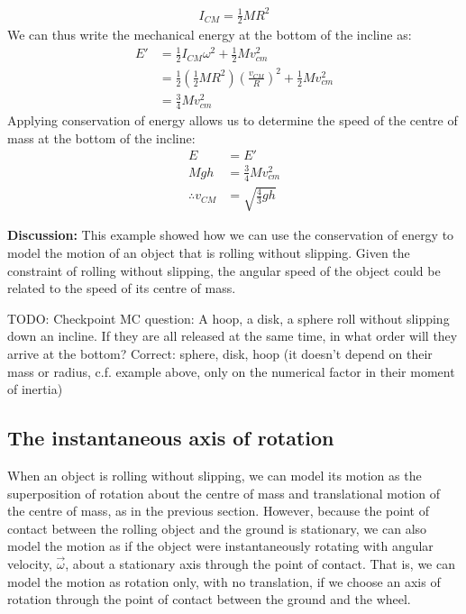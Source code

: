 \begin{example}
\begin{align*}
I_{CM}=\frac{1}{2}MR^2
\end{align*}
We can thus write the mechanical energy at the bottom of the incline as:
\begin{align*}
E' &= \frac{1}{2}I_{CM}\omega^2 + \frac{1}{2}Mv_{cm}^2\\
&=\frac{1}{2}\left(  \frac{1}{2}MR^2 \right) \left(  \frac{v_{CM}}{R}\right)^2+ \frac{1}{2}Mv_{cm}^2\\
&=\frac{3}{4}Mv_{cm}^2
\end{align*}
Applying conservation of energy allows us to determine the speed of the centre of mass at the bottom of the incline:
\begin{align*}
E &= E'\\
Mgh &= \frac{3}{4}Mv_{cm}^2\\
\therefore v_{CM} &= \sqrt{\frac{4}{3}gh}
\end{align*}

\textbf{Discussion:} This example showed how we can use the conservation of energy to model the motion of an object that is rolling without slipping. Given the constraint of rolling without slipping, the angular speed of the object could be related to the speed of its centre of mass.
\end{example}

TODO: Checkpoint MC question: A hoop, a disk, a sphere roll without slipping down an incline. If they are all released at the same time, in what order will they arrive at the bottom? Correct: sphere, disk, hoop (it doesn't depend on their mass or radius, c.f. example above, only on the numerical factor in their moment of inertia)

\subsection{The instantaneous axis of rotation}

When an object is rolling without slipping, we can model its motion as the superposition of rotation about the centre of mass and translational motion of the centre of mass, as in the previous section. However, because the point of contact between the rolling object and the ground is stationary, we can also model the motion as if the object were instantaneously rotating with angular velocity, $\vec \omega$, about a stationary axis through the point of contact. That is, we can model the motion as rotation only, with no translation, if we choose an axis of rotation through the point of contact between the ground and the wheel.

